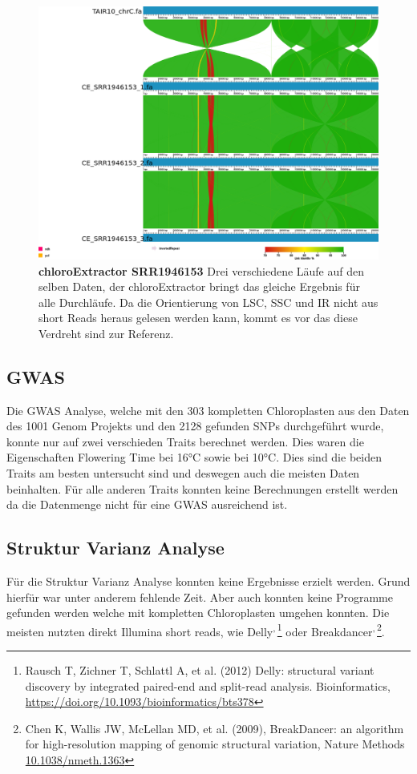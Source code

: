 \documentclass{scrartcl}
\begin{document}
\begin{figure}
\includegraphics[width=.9\linewidth]{./SRR1946153_CE_1.png}
\caption[chloroExtractor SRR1946153]{\textbf{chloroExtractor SRR1946153} Drei verschiedene Läufe auf den selben Daten, der chloroExtractor bringt das gleiche Ergebnis für alle Durchläufe. Da die Orientierung von LSC, SSC und IR nicht aus short Reads heraus gelesen werden kann, kommt es vor das diese Verdreht sind zur Referenz.}
\end{figure}
\subsection{GWAS}
\label{sec-4-8}
Die GWAS Analyse, welche mit den 303 kompletten Chloroplasten aus den Daten des 1001 Genom Projekts und den 2128 gefunden SNPs durchgeführt wurde, konnte nur auf zwei verschieden Traits berechnet werden. Dies waren 
die Eigenschaften Flowering Time bei 16°C sowie bei 10°C. Dies sind die beiden Traits am besten untersucht sind und deswegen auch die meisten Daten beinhalten. Für alle anderen Traits konnten
keine Berechnungen erstellt werden da die Datenmenge nicht für eine GWAS ausreichend ist. 
\subsection{Struktur Varianz Analyse}
\label{sec-4-9}
Für die Struktur Varianz Analyse konnten keine Ergebnisse erzielt werden. Grund hierfür war unter anderem fehlende Zeit. Aber auch konnten keine Programme gefunden werden welche mit kompletten Chloroplasten
umgehen konnten. Die meisten nutzten direkt Illumina short reads, wie Delly\footnotemark[64]{}\textsuperscript{,}\,\footnote{Rausch T, Zichner T, Schlattl A, et al. (2012) Delly: structural variant discovery by integrated paired-end and split-read analysis. Bioinformatics, \url{https://doi.org/10.1093/bioinformatics/bts378}} oder Breakdancer\footnotemark[65]{}\textsuperscript{,}\,\footnote{Chen K, Wallis JW, McLellan MD, et al. (2009), BreakDancer: an algorithm for high-resolution mapping of genomic structural variation, Nature Methods \url{10.1038/nmeth.1363}}. 
\end{document}
